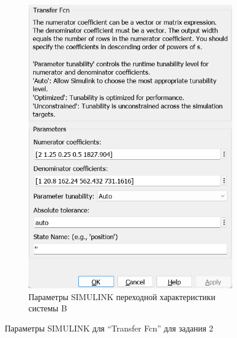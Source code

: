 \documentclass[a4paper, 12pt]{article}
\begin{document}
\begin{figure}[H]
\begin{subfigure}{0.3\textwidth}
            \includegraphics[width=\linewidth]{scheme2_window_B.png}
            \caption{Параметры SIMULINK переходной характеристики системы B}
            \label{fig:window2_B}
        \end{subfigure}
        \caption{Параметры SIMULINK для ``Transfer Fcn'' для задания 2}
        \label{fig:windows2}
    \end{figure}
\end{document}

